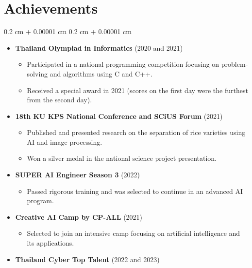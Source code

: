 \documentclass[8pt,letterpaper]{extarticle}
\newenvironment{highlights}{
    \begin{itemize}[
        topsep=0.10 cm,
        parsep=0.10 cm,
        partopsep=0pt,
        itemsep=0pt,
        leftmargin=0.4 cm + 10pt
    ]
}{
    \end{itemize}
} %
\newenvironment{onecolentry}{
    \begin{adjustwidth}{
        0.2 cm + 0.00001 cm
    }{
        0.2 cm + 0.00001 cm
    }
}{
    \end{adjustwidth}
} %
\begin{document}
    \section{Achievements}

        \begin{onecolentry}
            \begin{highlights}
                \item \textbf{Thailand Olympiad in Informatics} (2020 and 2021)
                    \begin{highlights}
                        \item Participated in a national programming competition focusing on problem-solving and algorithms using C and C++.
                        \item Received a special award in 2021 (scores on the first day were the furthest from the second day).
                    \end{highlights}
                \item \textbf{18th KU KPS National Conference and SCiUS Forum} (2021)
                    \begin{highlights}
                        \item Published and presented research on the separation of rice varieties using AI and image processing.
                        \item Won a silver medal in the national science project presentation.
                    \end{highlights}
                \item \textbf{SUPER AI Engineer Season 3} (2022)
                    \begin{highlights}
                        \item Passed rigorous training and was selected to continue in an advanced AI program.
                    \end{highlights}
                \item \textbf{Creative AI Camp by CP-ALL} (2021)
                    \begin{highlights}
                        \item Selected to join an intensive camp focusing on artificial intelligence and its applications.
                    \end{highlights}
                \item \textbf{Thailand Cyber Top Talent} (2022 and 2023)
                    \begin{highlights}

\end{highlights}
\end{highlights}
\end{onecolentry}
\end{document}
